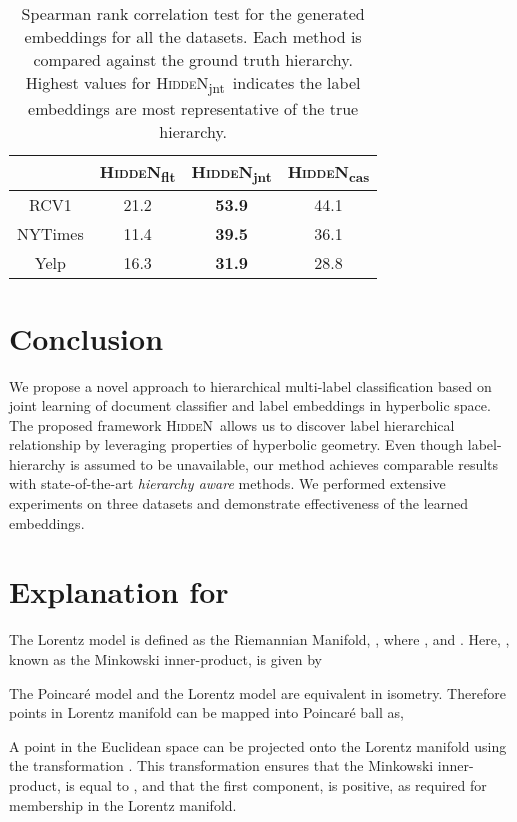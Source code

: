 \documentclass[11pt,a4paper]{article}
\newcommand{\model}{\mbox{\textsc{HiddeN}}}
\newcommand{\modeljnt}{\mbox{\textsc{HiddeN}\textsubscript{jnt}}}
\newcommand{\modelcas}{\mbox{\textsc{HiddeN}\textsubscript{cas}}}
\newcommand{\modelflt}{\mbox{\textsc{HiddeN}\textsubscript{flt}}}
\begin{document}
\begin{table}[!h]
\centering
\caption{Spearman rank correlation test for the generated embeddings for all the datasets. Each method is compared against the ground truth hierarchy. Highest values for \modeljnt\ indicates the label embeddings  are most representative of the true hierarchy.}
\label{tab:correlation}
\begin{adjustbox}{max width=0.48\textwidth}
\begin{tabular}{cccc} 
\toprule
& \modelflt & \modeljnt & \modelcas \\
\toprule
RCV1 & 21.2 & \textbf{53.9} & 44.1 \\
NYTimes & 11.4 & \textbf{39.5}   & 36.1 \\
Yelp & 16.3 & \textbf{31.9}   & 28.8 \\
\bottomrule
\end{tabular}
\end{adjustbox}
\end{table}

\section{Conclusion}
We propose a novel approach to hierarchical multi-label classification based on joint learning of document classifier and label embeddings in hyperbolic space. The proposed framework \model\ allows us to discover label hierarchical relationship by leveraging properties of hyperbolic geometry. Even though label-hierarchy is assumed to be unavailable, our method achieves comparable results with state-of-the-art \textit{hierarchy aware} methods. We performed extensive experiments on three datasets and demonstrate effectiveness of the learned embeddings.




\newpage
\appendix

\section{Explanation for }
The Lorentz model is defined as the Riemannian Manifold, , where , and . Here, , known as the Minkowski inner-product, is given by 


The Poincar\'e model and the Lorentz model are equivalent in isometry. Therefore points in Lorentz manifold can be mapped into Poincar\'e ball as, 


A point  in the Euclidean space  can be projected onto the Lorentz manifold  using the transformation . This transformation ensures that the Minkowski inner-product,  is equal to , and that the first component,  is positive, as required for membership in the Lorentz manifold. 
\end{document}
